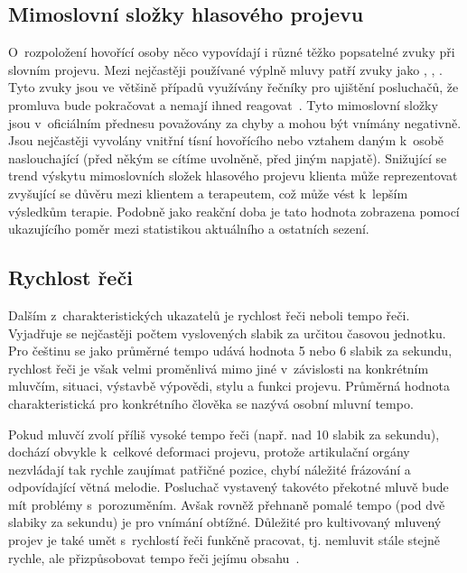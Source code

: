 \newpage

\subsection{Mimoslovní složky hlasového projevu}
O~rozpoložení hovořící osoby něco vypovídají i různé těžko popsatelné zvuky při slovním projevu. Mezi nejčastěji používané výplně mluvy patří zvuky jako , , . Tyto zvuky jsou ve většině případů využívány řečníky pro ujištění posluchačů, že promluva bude pokračovat a nemají ihned reagovat~\cite{krivohlavy}. Tyto mimoslovní složky jsou v~oficiálním přednesu považovány za chyby a mohou být vnímány negativně. Jsou nejčastěji vyvolány vnitřní tísní hovořícího nebo vztahem daným k~osobě naslouchající (před někým se cítíme uvolněně, před jiným napjatě). Snižující se trend výskytu mimoslovních složek hlasového projevu klienta může reprezentovat zvyšující se důvěru mezi klientem a terapeutem, což může vést k~lepším výsledkům terapie. Podobně jako reakční doba je tato hodnota zobrazena pomocí  ukazujícího poměr mezi statistikou aktuálního a ostatních sezení.


\subsection{Rychlost řeči}
Dalším z~charakteristických ukazatelů je rychlost řeči neboli tempo řeči. Vyjadřuje se nejčastěji počtem vyslovených slabik za určitou časovou jednotku. Pro češtinu se jako průměrné tempo udává hodnota 5 nebo 6 slabik za sekundu, rychlost řeči je však velmi proměnlivá mimo jiné v~závislosti na konkrétním mluvčím, situaci, výstavbě výpovědi, stylu a funkci projevu. Průměrná hodnota charakteristická pro konkrétního člověka se nazývá osobní mluvní tempo. 

Pokud mluvčí zvolí příliš vysoké tempo řeči (např. nad 10 slabik za sekundu), dochází obvykle k~celkové deformaci projevu, protože artikulační orgány nezvládají tak rychle zaujímat patřičné pozice, chybí náležité frázování a odpovídající větná melodie. Posluchač vystavený takovéto překotné mluvě bude mít problémy s~porozuměním. Avšak rovněž přehnaně pomalé tempo (pod dvě slabiky za sekundu) je pro vnímání obtížné. Důležité pro kultivovaný mluvený projev je také umět s~rychlostí řeči funkčně pracovat, tj. nemluvit stále stejně rychle, ale přizpůsobovat tempo řeči jejímu obsahu~\cite{speech_speed}. 

